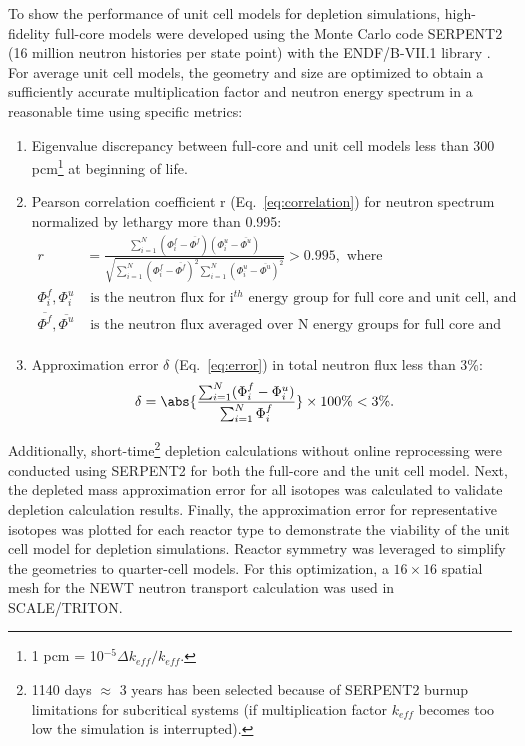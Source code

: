\documentclass[letterpaper]{mandc2019}
\begin{document}
To show the performance of unit cell models for depletion simulations, high-fidelity full-core models were developed using the Monte Carlo code SERPENT2 (16 million neutron histories per state point) with the ENDF/B-VII.1 library \cite{leppanen_serpent_2015, chadwick_endf/b-vii.1_2011}. 
For average unit cell models, the geometry and size are optimized to obtain a sufficiently accurate multiplication factor and neutron energy spectrum in a reasonable time using specific metrics:
\begin{enumerate}
	\item Eigenvalue discrepancy between full-core and unit cell models less than 300 pcm\footnote{ 1 pcm = 10$^{-5}\Delta k_{eff}/k_{eff}$.} at beginning of life.\vspace{-0.1in}
	\item Pearson correlation coefficient r (Eq.~\ref{eq:correlation}) for neutron spectrum normalized by lethargy more than 0.995:
\begin{align}
r &= \frac{\sum_{i=1}^{N} (\Phi_i^f-\overline{\Phi^f})(\Phi_i^u-\overline{\Phi^u})}
		  {\sqrt{\sum_{i=1}^{N} (\Phi_i^f-\overline{\Phi^f})^2 \sum_{i=1}^{N} (\Phi_i^u-\overline{\Phi^u})^2}} > 0.995 \label{eq:correlation}, \mbox{ where} \\
\Phi_i^f,\Phi_i^u & \mbox{ is the neutron flux for i$^{th}$ energy group for full core and unit cell, and} \nonumber\\
\overline{\Phi^f}, \overline{\Phi^u} & \mbox{ is the neutron flux averaged over N energy groups for full core and unit cell.} \nonumber \\
\end{align}		\vspace{-0.3in}
	\item Approximation error $\delta$ (Eq.~\ref{eq:error})  in total neutron flux less than 3\%:
\begin{align}
\delta &= \abs{\frac{\sum_{i=1}^{N} (\Phi_i^f-\Phi_i^u)}
{\sum_{i=1}^{N} \Phi_i^f}} \times 100\% < 3\%. \label{eq:error}
\end{align}	
	\vspace{-0.4in}
\end{enumerate}

Additionally, short-time\footnote{1140 days $\approx$ 3 years has been selected because of SERPENT2 burnup limitations for subcritical systems (if multiplication factor $k_{eff}$ becomes too low the simulation is interrupted).} depletion calculations without online reprocessing were conducted using SERPENT2 for both the full-core and the unit cell model. 
Next, the depleted mass approximation error for all isotopes was calculated to validate depletion calculation results. 
Finally, the approximation error for representative isotopes was plotted for each reactor type to demonstrate the viability of the unit cell model for depletion simulations. 
Reactor symmetry was leveraged to simplify the geometries to quarter-cell models. 
For this optimization, a $16\times 16$ spatial mesh for the NEWT neutron transport calculation was used in SCALE/TRITON.
\end{document}
